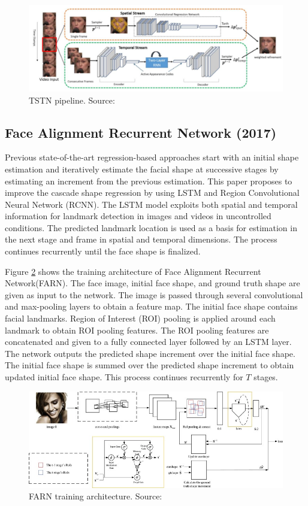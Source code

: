 \documentclass{llncs}
\begin{document}
\begin{figure}
\centering
\includegraphics[scale=0.5]{Media/TSTN}
\caption{TSTN pipeline. Source:\cite{tstn}}
\label{TSTN}
\end{figure}

\subsection{Face Alignment Recurrent Network (2017) \cite{farn}}

Previous state-of-the-art regression-based approaches start with an initial shape estimation and iteratively estimate the facial shape at successive stages by estimating an increment from the previous estimation. This paper proposes to improve the cascade shape regression by using LSTM and Region Convolutional Neural Network (RCNN). The LSTM model exploits both spatial and temporal information for landmark detection in images and videos in uncontrolled conditions. The predicted landmark location is used as a basis for estimation in the next stage and frame in spatial and temporal dimensions. The process continues recurrently until the face shape is finalized. 

Figure \ref{farn_training} shows the training architecture of Face Alignment Recurrent Network(FARN). The face image, initial face shape, and ground truth shape are given as input to the network. The image is passed through several convolutional and max-pooling layers to obtain a feature map. The initial face shape contains facial landmarks. Region of Interest (ROI) pooling is applied around each landmark to obtain ROI pooling features. The ROI pooling features are concatenated and given to a fully connected layer followed by an LSTM layer. The network outputs the predicted shape increment over the initial face shape. The initial face shape is summed over the predicted shape increment to obtain updated initial face shape. This process continues recurrently for $T$ stages.

\begin{figure}
\centering
\includegraphics[scale=0.5]{Media/farn_training}
\caption{FARN training architecture. Source:\cite{farn}}
\label{farn_training}
\end{figure}
\end{document}
